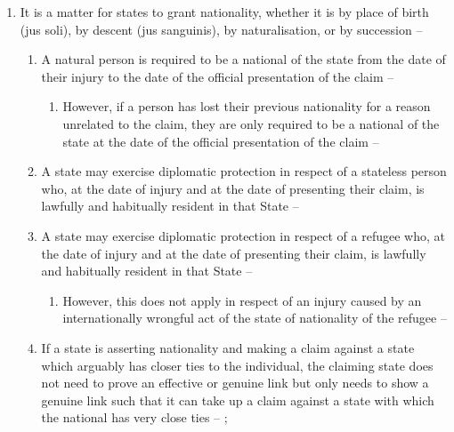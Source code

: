 \begin{enumerate}
\begin{enumerate}
        \item It is a matter for states to grant nationality, whether it is by place of birth (jus soli), by descent (jus sanguinis), by naturalisation, or by succession -- 
        \begin{enumerate}
            \item A natural person is required to be a national of the state from the date of their injury to the date of the official presentation of the claim -- 
            \begin{enumerate}
                \item However, if a person has lost their previous nationality for a reason unrelated to the claim, they are only required to be a national of the state at the date of the official presentation of the claim -- 
            \end{enumerate}
            \item A state may exercise diplomatic protection in respect of a stateless person who, at the date of injury and at the date of presenting their claim, is lawfully and habitually resident in that State -- 
            \item A state may exercise diplomatic protection in respect of a refugee who, at the date of injury and at the date of presenting their claim, is lawfully and habitually resident in that State -- 
            \begin{enumerate}
                \item However, this does not apply in respect of an injury caused by an internationally wrongful act of the state of nationality of the refugee -- 
            \end{enumerate}
            \item If a state is asserting nationality and making a claim against a state which arguably has closer ties to the individual, the claiming state does not need to prove an effective or genuine link but only needs to show a genuine link such that it can take up a claim against a state with which the national has very close ties -- ; 

\end{enumerate}
\end{enumerate}
\end{enumerate}
